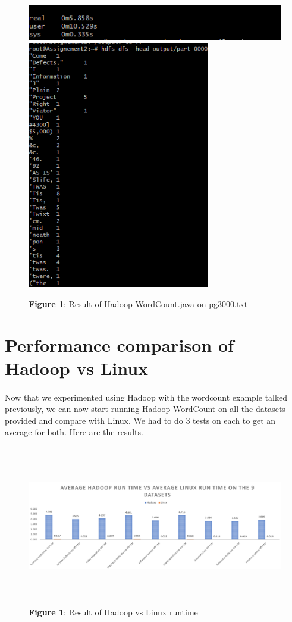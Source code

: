\documentclass[12pt]{article}
\begin{document}
	\begin{figure}[H]
	\centering
	\includegraphics[width=140mm, scale=0.5]{images/hadoop-time.png}
	\includegraphics[width=80mm, scale=0.75]{images/output-pg4300.png}
	\caption*{\textbf{Figure 1}: Result of Hadoop WordCount.java on pg3000.txt}
	\end{figure}

\section{Performance comparison of Hadoop vs Linux}
    \paragraph{} Now that we experimented using Hadoop with the wordcount example talked previously, 
	we can now start running Hadoop WordCount on all the datasets provided and compare with Linux. 
	We had to do 3 tests on each to get an average for both. Here are the results.

	\begin{figure}[H]
	\centering
	\includegraphics[width=160mm, height=70mm, scale=1.0]{images/Hadoop_vs_Linux_graph.PNG}
	\caption*{\textbf{Figure 1}: Result of Hadoop vs Linux runtime}
	\end{figure}
		
\end{document}
